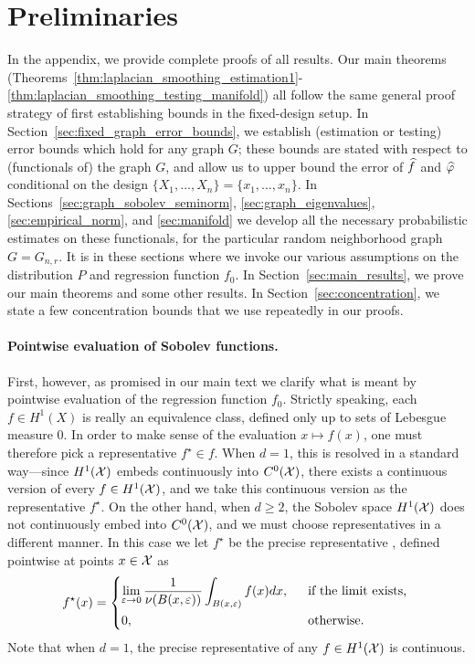 \section{Preliminaries}
\label{app:preliminaries}
\noindent In the appendix, we provide complete proofs of all results. %
Our main theorems (Theorems~\ref{thm:laplacian_smoothing_estimation1}-\ref{thm:laplacian_smoothing_testing_manifold}) all follow the same general proof strategy of first establishing bounds in the fixed-design setup. In Section~\ref{sec:fixed_graph_error_bounds}, we establish (estimation or testing) error bounds which hold for any graph $G$; these bounds are stated with respect to (functionals of) the graph $G$, and allow us to upper bound the error of $\widehat{f}$ and $\widehat{\varphi}$ conditional on the design $\{X_1,\ldots,X_n\} = \{x_1,\ldots,x_n\}$. In Sections~\ref{sec:graph_sobolev_seminorm}, \ref{sec:graph_eigenvalues}, \ref{sec:empirical_norm}, and \ref{sec:manifold} we develop all the necessary probabilistic estimates on these functionals, for the particular random neighborhood graph $G = G_{n,r}$. It is in these sections where we invoke our various assumptions on the distribution $P$ and regression function $f_0$. In Section~\ref{sec:main_results}, we prove our main theorems and some other results. In Section~\ref{sec:concentration}, we state a few concentration bounds that we use repeatedly in our proofs.

\paragraph{Pointwise evaluation of Sobolev functions.}
First, however, as promised in our main text we clarify what is meant by pointwise evaluation of the regression function $f_0$. Strictly speaking, each $f \in H^1(X)$ is really an equivalence class, defined only up to sets of Lebesgue measure 0. In order to make sense of the evaluation $x \mapsto f(x)$, one must therefore pick a representative $f^{\star} \in f$. When $d = 1$, this is resolved in a standard way---since $H^1(\mathcal{X})$ embeds continuously into $C^0(\mathcal{X})$, there exists a continuous version of every $f \in H^1(\mathcal{X})$, and we take this continuous version as the representative $f^{\star}$. On the other hand, when $d \geq 2$, the Sobolev space $H^1(\mathcal{X})$ does not continuously embed into $C^0(\mathcal{X})$, and we must choose representatives in a different manner. In this case we let $f^{\star}$ be the precise representative \citep{evans15}, defined pointwise at points $x \in \mathcal{X}$ as
\begin{equation*}
f^{\star}(x) = 
\begin{dcases*}
\lim_{\varepsilon \to 0} \frac{1}{\nu(B(x,\varepsilon))} \int_{B(x,\varepsilon)} f(x) dx,&~~\textrm{if the limit exists,} \\
0,&~~\textrm{otherwise.}
\end{dcases*}
\end{equation*}
Note that when $d = 1$, the precise representative of any $f \in H^1(\mathcal{X})$ is continuous. 

